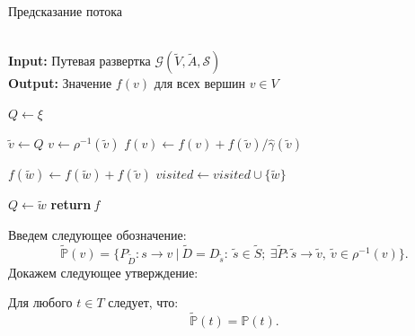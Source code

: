 \documentclass[../thesis.tex]{subfiles}
\begin{document}
\begin{algorithm}
\caption{Предсказание потока} \label{alg:flow_propagation}
\hspace*{\algorithmicindent} \\
\hspace*{\algorithmicindent} \textbf{Input:} Путевая развертка $\mathcal{G}(\widetilde{V}, \widetilde{A}, \mathscr{S})$ \\
\hspace*{\algorithmicindent} \textbf{Output:} Значение $f(v)$ для всех вершин $v\in V$
\begin{algorithmic}[1]
    \State $Q\gets \xi$
\EndFor

 \label{alg:flow_propagation:main_loop_begin}
    \State $\tilde{v}\gets Q$
    \State $v\gets \rho^{-1}(\tilde{v})$
    \State $f(v)\gets f(v) + f(\tilde{v}) / \hat{\gamma}(\tilde{v})$
    
        \State $f(\tilde{w})\gets f(\tilde{w}) + f(\tilde{v})$
        \State $visited\gets visited\cup \{\tilde{w}\}$
        
            \State $Q\gets \tilde{w}$
        \EndIf
    \EndFor
\EndWhile \label{alg:flow_propagation:main_loop_end}
\State \textbf{return}$\ f$
\EndProcedure
\end{algorithmic}
\end{algorithm}

Введем следующее обозначение:
\begin{equation}
    \widetilde{\mathbb{P}}(v)
     = \Big\{ P_{\widetilde{D}}
         : s\rightarrow v\ 
       |\ 
         \widetilde{D} = D_{\tilde{s}}:\ 
         \tilde{s}\in \widetilde{S};\ 
         \exists \tilde{P}: \tilde{s}\rightarrow \tilde{v},\ 
         \tilde{v}\in \rho^{-1}(v)
       \Big\}.
\end{equation}
Докажем следующее утверждение:

\begin{proposition} \label{th:path_scan_at_vertex}
Для любого $t\in T$ следует, что:
\begin{equation}
    \widetilde{\mathbb{P}}(t) = \mathbb{P}(t).
\end{equation}
\end{proposition}
\end{document}
